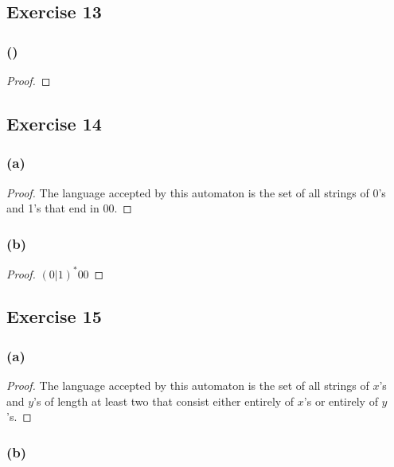 \documentclass[14pt]{extarticle}
\begin{document}
\subsection{Exercise 13}

\subsubsection{()}

\begin{proof}

\end{proof}

\subsection{Exercise 14}

\subsubsection{(a)}

\begin{proof}
The language accepted by this automaton is the set of all strings of 0’s and 1’s that end in 00.
\end{proof}

\subsubsection{(b)}

\begin{proof}
\((0 | 1)^*00\)
\end{proof}

\subsection{Exercise 15}

\subsubsection{(a)}

\begin{proof}
The language accepted by this automaton is the set of all strings of \(x\)’s and \(y\)’s of length at least two that 
consist either entirely of \(x\)’s or entirely of \(y\)’s.
\end{proof}

\subsubsection{(b)}
\end{document}
